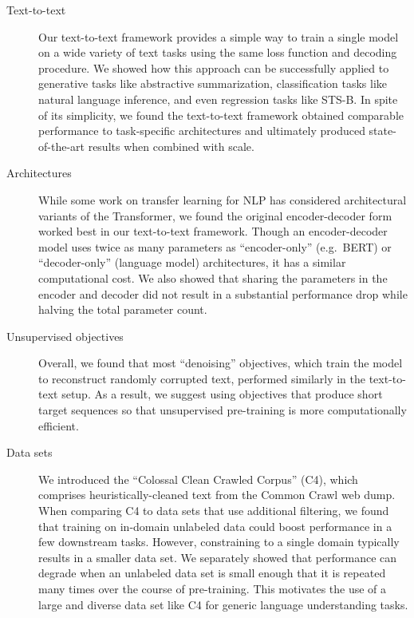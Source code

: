 \documentclass[twoside,11pt]{article}
\begin{document}
\begin{description}

\item[Text-to-text] Our text-to-text framework provides a simple way to train a single model on a wide variety of text tasks using the same loss function and decoding procedure.
We showed how this approach can be successfully applied to generative tasks like abstractive summarization, classification tasks like natural language inference, and even regression tasks like STS-B.
In spite of its simplicity, we found the text-to-text framework obtained comparable performance to task-specific architectures and ultimately produced state-of-the-art results when combined with scale.

\item[Architectures] While some work on transfer learning for NLP has considered architectural variants of the Transformer, we found the original encoder-decoder form worked best in our text-to-text framework.
Though an encoder-decoder model uses twice as many parameters as ``encoder-only'' (e.g.\ BERT) or ``decoder-only'' (language model) architectures, it has a similar computational cost.
We also showed that sharing the parameters in the encoder and decoder did not result in a substantial performance drop while halving the total parameter count.

\item[Unsupervised objectives] Overall, we found that most ``denoising'' objectives, which train the model to reconstruct randomly corrupted text, performed similarly in the text-to-text setup.
As a result, we suggest using objectives that produce short target sequences so that unsupervised pre-training is more computationally efficient.

\item[Data sets] We introduced the ``Colossal Clean Crawled Corpus'' (C4), which comprises heuristically-cleaned text from the Common Crawl web dump.
When comparing C4 to data sets that use additional filtering, we found that training on in-domain unlabeled data could boost performance in a few downstream tasks.
However, constraining to a single domain typically results in a smaller data set.
We separately showed that performance can degrade when an unlabeled data set is small enough that it is repeated many times over the course of pre-training.
This motivates the use of a large and diverse data set like C4 for generic language understanding tasks.


\end{description}
\end{document}
